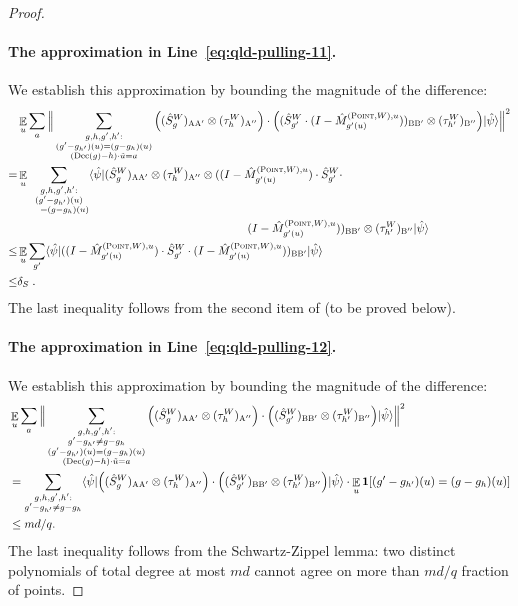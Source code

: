 \documentclass[11pt]{article}
\theoremstyle{definition}
\newcommand{\ket}[1]{|#1\rangle}
\newcommand{\bra}[1]{\langle#1|}
\newcommand{\Id}{\ensuremath{I}}
\newcommand{\E}{\mathop{\mathbb{E}}\displaylimits}
\newcommand{\labelstyle}[1]{\ensuremath{\textsc{#1}}\xspace}
\newcommand{\alice}{\labelstyle{A}}
\newcommand{\bob}{\labelstyle{B}}
\newcommand{\typestyle}[1]{\ensuremath{\textsc{#1}}\xspace}
\newcommand{\Point}{\typestyle{Point}}
\newcommand{\coded}{\mathrm{Dec}}
\begin{document}
\begin{proof}
\paragraph{The approximation in Line~\eqref{eq:qld-pulling-11}.} We establish this approximation by bounding the magnitude of the difference:
\begin{align*}
	&\E_u \sum_a \Big \| \sum_{\substack{g,h,g',h': \\ (g' - g_{h'})(u) = (g -g_h)(u) \\ (\coded(g)-h)\cdot \tilde{u} = a}} \Big((\hat{S}^W_g)_{\alice \alice'} \otimes (\tau_h^W)_{\alice''} \Big) \cdot \Big( (\hat{S}^W_{g'} \cdot (\Id - \hat{M}^{(\Point,W),u}_{g'(u)}))_{\bob \bob'} \otimes (\tau_{h'}^W)_{\bob''} \Big) \ket{\hat{\psi}} \Big \|^2 \\
	=& \E_u \sum_{\substack{g,h,g',h': \\ (g' - g_{h'})(u) \\ \quad = (g -g_h)(u)}} \bra{\hat{\psi}} (\hat{S}^W_g)_{\alice \alice'} \otimes (\tau_h^W)_{\alice''} \otimes ((\Id - \hat{M}^{(\Point,W),u}_{g'(u)}) \cdot \hat{S}^W_{g'} \cdot \notag \\
  &\hspace{20em}(\Id - \hat{M}^{(\Point,W),u}_{g'(u)}))_{\bob \bob'} \otimes (\tau_{h'}^W)_{\bob''} \ket{\hat{\psi}}  \\
	\leq& \E_u \sum_{g'} \bra{\hat{\psi}} ((\Id - \hat{M}^{(\Point,W),u}_{g'(u)}) \cdot \hat{S}^W_{g'} \cdot (\Id - \hat{M}^{(\Point,W),u}_{g'(u)}))_{\bob \bob'} \ket{\hat{\psi}} \\
	\leq& \delta_S \;.
\end{align*}
The last inequality follows from the second item of  (to be proved below). 

\paragraph{The approximation in Line~\eqref{eq:qld-pulling-12}.} We establish this approximation by bounding the magnitude of the difference:
\begin{align*}
	&\E_u \sum_a \Big \| \sum_{\substack{g,h,g',h': \\ g' - g_{h'} \neq g -g_h \\ (g' - g_{h'})(u) = (g -g_h)(u) \\ (\coded(g)-h)\cdot \tilde{u} = a}} \Big((\hat{S}^W_g)_{\alice \alice'} \otimes (\tau_h^W)_{\alice''} \Big) \cdot \Big( (\hat{S}^W_{g'})_{\bob \bob'} \otimes (\tau_{h'}^W)_{\bob''} \Big) \ket{\hat{\psi}} \Big \|^2 \\
	&= \sum_{\substack{g,h,g',h': \\ g' - g_{h'} \neq g -g_h}} \bra{\hat{\psi}} \Big((\hat{S}^W_g)_{\alice \alice'} \otimes (\tau_h^W)_{\alice''} \Big) \cdot \Big( (\hat{S}^W_{g'})_{\bob \bob'} \otimes (\tau_{h'}^W)_{\bob''} \Big) \ket{\hat{\psi}} \cdot \E_u \mathbf{1}[(g' - g_{h'})(u) = (g -g_h)(u)] \\
	&\leq md/q.
\end{align*}
The last inequality follows from the Schwartz-Zippel lemma: two distinct polynomials of total degree at most $md$ cannot agree on more than $md/q$ fraction of points. 


\end{proof}
\end{document}
